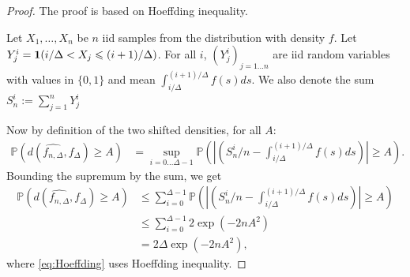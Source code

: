 \documentclass[11pt]{article}
\renewcommand{\geq}{\geqslant}
\renewcommand{\leq}{\leqslant}
\begin{document}
\begin{proof}
  
  The proof is based on Hoeffding inequality.
  
Let $X_1,\ldots,X_n$ be $n$ iid samples from the distribution with density $f$.
Let $Y^i_j = {\bf 1}(i/\Delta < X_j \leq (i+1)/\Delta)$.
For all $i$, $(Y^i_j)_{j=1...n}$ are iid random variables with values in $\{0,1\}$ and  mean $\int_{i/\Delta}^{(i+1)/\Delta} f(s) ds$.
We also denote the sum $S_n^i :=\sum_{j=1}^n Y^i_j$

Now by definition of the two shifted densities, for all $A$:
    \begin{align*}
        \mathbb{P}(d(\widehat{f_{n, \Delta}},f_\Delta )  \geq A) & = 
                                                                                     \sup_{i=0...\Delta-1} \mathbb{P} ( | (S_n^i /n- \int_{i/\Delta}^{(i+1)/\Delta} f(s) ds)| \geq A).
    \end{align*}
    Bounding the supremum by the sum, we get 
   \begin{align}
        \mathbb{P}(d(\widehat{f_{n, \Delta}},f_\Delta )  \geq A) & \leq
                                                                                     \sum_{i=0}^{\Delta-1} \mathbb{P} ( |(S_n^i /n- \int_{i/\Delta}^{(i+1)/\Delta} f(s) ds)  | \geq A) \label{eq1} \\
                                                                                   &\leq   \sum_{i=0}^{\Delta-1}  2 \exp(-2nA^2) \label{eq:Hoeffding} \\
      &=   2\Delta  \exp(-2nA^2),
         \end{align}
         where \eqref{eq:Hoeffding} uses Hoeffding inequality.

         

      





\end{proof}
\end{document}
